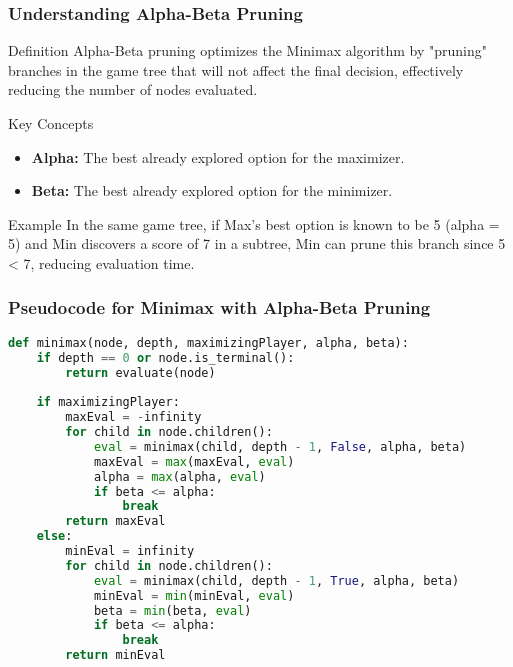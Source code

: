 \documentclass[aspectratio=169]{beamer}
\begin{document}
\begin{frame}[fragile]
    \frametitle{Understanding Alpha-Beta Pruning}
    \begin{block}{Definition}
        Alpha-Beta pruning optimizes the Minimax algorithm by "pruning" branches in the game tree that will not affect the final decision, effectively reducing the number of nodes evaluated.
    \end{block}
    \begin{block}{Key Concepts}
        \begin{itemize}
            \item \textbf{Alpha:} The best already explored option for the maximizer.
            \item \textbf{Beta:} The best already explored option for the minimizer.
        \end{itemize}
    \end{block}

    \begin{block}{Example}
        In the same game tree, if Max’s best option is known to be 5 (alpha = 5) and Min discovers a score of 7 in a subtree, Min can prune this branch since 5 < 7, reducing evaluation time.
    \end{block}
\end{frame}

\begin{frame}[fragile]
    \frametitle{Pseudocode for Minimax with Alpha-Beta Pruning}
    \begin{lstlisting}[language=Python]
def minimax(node, depth, maximizingPlayer, alpha, beta):
    if depth == 0 or node.is_terminal():
        return evaluate(node)
    
    if maximizingPlayer:
        maxEval = -infinity
        for child in node.children():
            eval = minimax(child, depth - 1, False, alpha, beta)
            maxEval = max(maxEval, eval)
            alpha = max(alpha, eval)
            if beta <= alpha:
                break
        return maxEval
    else:
        minEval = infinity
        for child in node.children():
            eval = minimax(child, depth - 1, True, alpha, beta)
            minEval = min(minEval, eval)
            beta = min(beta, eval)
            if beta <= alpha:
                break
        return minEval
    \end{lstlisting}
\end{frame}
\end{document}
